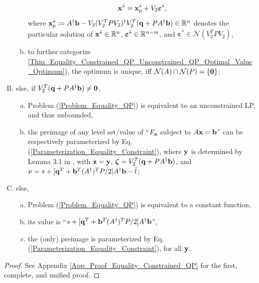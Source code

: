 \documentclass{imaman}
\newcommand{\beq}{\begin{eqnarray}}
\newcommand{\eeq}{\end{eqnarray}}
\newcommand{\bfb}{{\bf b}}
\newcommand{\bfx}{{\bf x}}
\newcommand{\bfq}{{\bf q}}
\newcommand{\bfy}{{\bf y}}
\newcommand{\bfz}{{\bf z}}
\newcommand{\bfvarepsilon}{{\boldsymbol \varepsilon}}
\newcommand{\bfzeta}{{\boldsymbol \zeta}}
\newcommand{\bfzero}{{\bf 0}}
\newcommand{\real}{\mathbb{R}}
\newcommand{\calN}{{\mathcal N}}
\newcommand{\itm}{{\it m}}
\newcommand{\itn}{{\it n}}
\numberwithin{equation}{section}
\begin{document}
\begin{theorem}
\begin{enumerate}[A)]
\begin{enumerate}[a)]
        \beq
        \bfx^{\bar *}=\bfx_p^{\bar *}+V_2\bfvarepsilon^{\bar *},
        \label{Optimum_Equality_Constrained_QP_Unconstrained_QP}
        \eeq
        where $\bfx_p^{\bar *}\coloneqq A^\dagger\bfb-V_2(V_2^TPV_2)^\dagger V_2^T(\bfq+PA^\dagger\bfb)\in\real^\itn$ denotes the particular solution of $\bfx^{\bar *}\in\real^\itn$, $\bfvarepsilon^{\bar *}\in\real^{\itn-\itm}$, and $\bfvarepsilon^{\bar *}\in\calN(V_2^TPV_2)$,
    \item\label{Thm_Equality_Constrained_QP_Unconstrained_QP_Uniqueness} to further categorize {\rm\ref{Thm_Equality_Constrained_QP_Unconstrained_QP_Optimal_Value_Optimum})}, the optimum is unique, iff $\calN(A)\cap\calN(P)=\{\bfzero\}$;
    \end{enumerate}
\item\label{Thm_Equality_Constrained_QP_Condition_Unconstrained_LP} else, if $V_2^T(\bfq+PA^\dagger\bfb)\ne\bfzero$,
    \begin{enumerate}[a)]
    \item Problem {\rm(\ref{Problem_Equality_QP})} is equivalent to an unconstrained LP, and thus unbounded,
    \item the preimage of any level set/value of ``$F_\bfx$ subject to $A\bfx=\bfb$'' can be respectively parameterized by Eq. (\ref{Parameterization_Equality_Constraint}), where $\bfy$ is determined by Lemma {\rm 3.1} in {\rm \cite{LiLiHs:20}}, with $\bfz=\bfy$, $\bfzeta=V_2^T(\bfq+PA^\dagger\bfb)$, and $\nu=s+[\bfq^T+\bfb^T(A^\dagger)^TP/2]A^\dagger\bfb-\bar l$;
    \end{enumerate}
\item\label{Thm_Equality_Constrained_QP_Condition_Constant} else,
    \begin{enumerate}[a)]
    \item Problem {\rm(\ref{Problem_Equality_QP})} is equivalent to a constant function,
    \item its value is ``$s+[\bfq^T+\bfb^T(A^\dagger)^TP/2]A^\dagger\bfb$'',
    \item the (only) preimage is parameterized by Eq. {\rm(\ref{Parameterization_Equality_Constraint})}, for all $\bfy$.
    \end{enumerate}
\end{enumerate}
\label{Thm_Equality_Constrained_QP}
\end{theorem}

\begin{proof}
See Appendix \ref{App_Proof_Equality_Constrained_QP} for the first, complete, and unified proof.
\end{proof}
\end{document}
